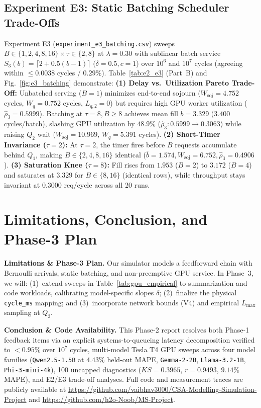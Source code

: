 \documentclass[conference]{IEEEtran}
\begin{document}
\subsection{Experiment E3: Static Batching Scheduler Trade-Offs}
Experiment E3 (\texttt{experiment\_e3\_batching.csv}) sweeps $B \in \{1, 2, 4, 8, 16\} \times \tau \in \{2, 8\}$ at $\lambda{=}0.30$ with sublinear batch service $S_3(b) = \lceil 2 + 0.5(b - 1) \rceil$ ($\delta{=}0.5, c{=}1$) over $10^6$ and $10^7$ cycles (agreeing within $\le 0.0038$ cycles / $0.29\%$). Table~\ref{tab:e2_e3} (Part~B) and Fig.~\ref{fig:e3_batching} demonstrate:
\textbf{(1) Delay vs.\ Utilization Pareto Trade-Off:} Unbatched serving ($B{=}1$) minimizes end-to-end sojourn ($W_{\text{soj}}{=}4.752$ cycles, $W_q{=}0.752$ cycles, $L_{q,2}{=}0$) but requires high GPU worker utilization ($\hat{\rho}_3{=}0.5999$). Batching at $\tau{=}8, B{\ge}8$ achieves mean fill $\bar{b}{=}3.329$ ($3.400$ cycles/batch), slashing GPU utilization by $\mathbf{48.9\%}$ ($\hat{\rho}_3: 0.5999 \to 0.3063$) while raising $Q_2$ wait ($W_{\text{soj}}{=}10.969$, $W_q{=}5.391$ cycles).
\textbf{(2) Short-Timer Invariance ($\tau{=}2$):} At $\tau{=}2$, the timer fires before $B$ requests accumulate behind $Q_1$, making $B \in \{2,4,8,16\}$ identical ($\bar{b}{=}1.574, W_{\text{soj}}{=}6.752, \hat{\rho}_3{=}0.4906$).
\textbf{(3) Saturation Knee ($\tau{=}8$):} Fill rises from $1.953$ ($B{=}2$) to $3.172$ ($B{=}4$) and saturates at $3.329$ for $B \in \{8, 16\}$ (identical rows), while throughput stays invariant at $0.3000\text{ req/cycle}$ across all 20 runs.

\section{Limitations, Conclusion, and Phase-3 Plan}
\textbf{Limitations \& Phase-3 Plan.} Our simulator models a feedforward chain with Bernoulli arrivals, static batching, and non-preemptive GPU service. In Phase~3, we will: (1)~extend sweeps in Table~\ref{tab:gpu_empirical} to summarization and code workloads, calibrating model-specific slopes $\delta$; (2)~finalize the physical \texttt{cycle\_ms} mapping; and (3)~incorporate network bounds (V4) and empirical $L_{\max}$ sampling at $Q_3$.

\textbf{Conclusion \& Code Availability.} This Phase-2 report resolves both Phase-1 feedback items via an explicit systems-to-queueing latency decomposition verified to $<0.95\%$ over $10^7$ cycles, multi-model Tesla T4 GPU sweeps across four model families (\texttt{Qwen2.5-1.5B} at $4.43\%$ held-out MAPE, \texttt{Gemma-2-2B}, \texttt{Llama-3.2-1B}, \texttt{Phi-3-mini-4k}), 100 uncapped diagnostics ($KS{=}0.3965$, $r{=}0.9493$, $9.14\%$ MAPE), and E2/E3 trade-off analyses. Full code and measurement traces are publicly available at \textcolor{blue}{\url{https://github.com/vaibhav3000/CSA-Modelling-Simulation-Project}} and \textcolor{blue}{\url{https://github.com/h2o-Noob/MS-Project}}.
\end{document}
